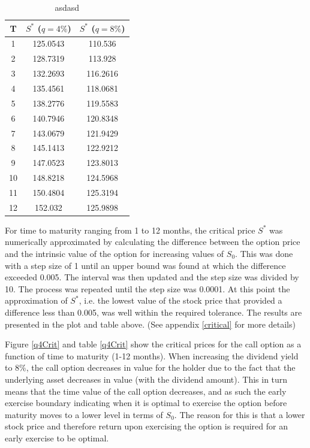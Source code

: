 \documentclass{article}
\begin{document}
\begin{table}[H]
	\begin{center}
		\begin{tabular}{ || c | c | c ||}
		\hline
		T & $S^*$ ($q=4\%$) & $S^*$ ($q=8\%$)\\ 
		\hline
		1 & 125.0543  & 110.536\\ 
		2 & 128.7319  & 113.928\\ 
		3 & 132.2693  & 116.2616\\ 
		4 & 135.4561  & 118.0681\\ 
		5 & 138.2776  & 119.5583\\ 
		6 & 140.7946  & 120.8348\\ 
		7 & 143.0679  & 121.9429\\ 
		8 & 145.1413  & 122.9212\\ 
		9 & 147.0523  & 123.8013\\ 
		10 & 148.8218 & 124.5968\\ 
		11 & 150.4804 & 125.3194\\ 
		12 & 152.032  & 125.9898\\ 
		\hline 
		\end{tabular}
	\end{center}
	\caption{asdasd}
	\label{q4table}
\end{table}


For time to maturity ranging from 1 to 12 months, the critical price $S^*$ was numerically approximated by calculating the difference between the option price and the intrinsic value of the option for increasing values of $S_0$. This was done with a step size of 1 until an upper bound was found at which the difference exceeded 0.005. The interval was then updated and the step size was divided by 10. The process was repeated until the step size was 0.0001. At this point the approximation of $S^*$, i.e. the lowest value of the stock price that provided a difference less than 0.005, was well within the required tolerance. The results are presented in the plot and table above. (See appendix \ref{critical} for more details)

Figure \ref{q4Crit} and table \ref{q4Crit} show the critical prices for the call option as a function of time to maturity (1-12 months). When increasing the dividend yield to $8\%$, the call option decreases in value for the holder due to the fact that the underlying asset decreases in value (with the dividend amount). This in turn means that the time value of the call option decreases, and as such the early exercise boundary indicating when it is optimal to exercise the option before maturity moves to a lower level in terms of $S_0$. The reason for this is that a lower stock price and therefore return upon exercising the option is required for an early exercise to be optimal. 
	
\end{document}
